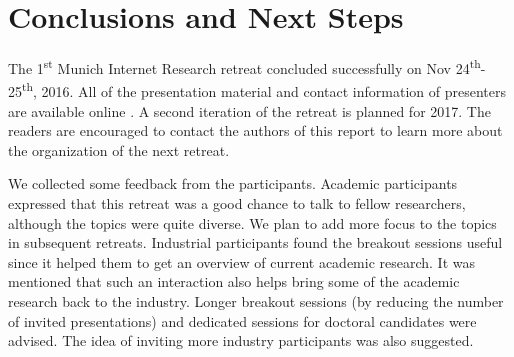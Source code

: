 \section{Conclusions and Next Steps}\label{sec:conclusion}

The 1\textsuperscript{st} Munich Internet Research retreat concluded
successfully on Nov 24\textsuperscript{th}-25\textsuperscript{th}, 2016. All
of the presentation material and contact information of presenters are
available online \cite{mir-materials}. A second iteration of the retreat is
planned for 2017.  The readers are encouraged to contact the authors of this
report to learn more about the organization of the next retreat.

We collected some feedback from the participants. Academic participants
expressed that this retreat was a good chance to talk to fellow researchers,
although the topics were quite diverse. We plan to add more focus to the
topics in subsequent retreats. Industrial participants found the breakout
sessions useful since it helped them to get an overview of current academic
research. It was mentioned that such an interaction also helps bring some of
the academic research back to the industry. Longer breakout sessions (by
reducing the number of invited presentations) and dedicated sessions for
doctoral candidates were advised. The idea of inviting more industry
participants was also suggested.






